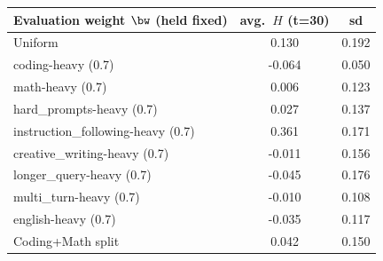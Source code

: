 \begin{tabular}{lcc}
\toprule
Evaluation weight $\bw$ (held fixed) & avg.\ $H$ (t=30) & sd \\
\midrule
Uniform & 0.130 & 0.192 \\
coding-heavy (0.7) & -0.064 & 0.050 \\
math-heavy (0.7) & 0.006 & 0.123 \\
hard_prompts-heavy (0.7) & 0.027 & 0.137 \\
instruction_following-heavy (0.7) & 0.361 & 0.171 \\
creative_writing-heavy (0.7) & -0.011 & 0.156 \\
longer_query-heavy (0.7) & -0.045 & 0.176 \\
multi_turn-heavy (0.7) & -0.010 & 0.108 \\
english-heavy (0.7) & -0.035 & 0.117 \\
Coding+Math split & 0.042 & 0.150 \\
\bottomrule
\end{tabular}
